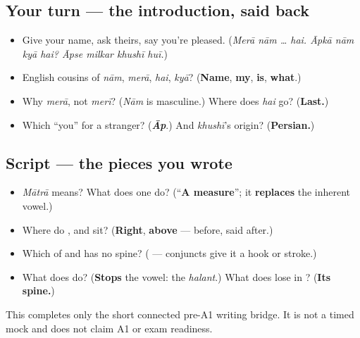 \subsection*{Your turn — the introduction, said back}
\begin{itemize}
\raggedright
  \item Give your name, ask theirs, say you're pleased. (\emph{Merā nām … hai. Āpkā nām kyā hai? Āpse milkar khushī huī.})
  \item English cousins of \emph{nām}, \emph{merā}, \emph{hai}, \emph{kyā}? (\textbf{Name}, \textbf{my}, \textbf{is}, \textbf{what}.)
  \item Why \emph{merā}, not \emph{merī}? (\emph{Nām} is masculine.) Where does \emph{hai} go? (\textbf{Last.})
  \item Which \textquotedblleft{}you\textquotedblright{} for a stranger? (\emph{\textbf{Āp}}.) And \emph{khushī}'s origin? (\textbf{Persian.})
\end{itemize}

\subsection*{Script — the pieces you wrote}
\begin{itemize}
\raggedright
  \item \emph{Mātrā} means? What does one do? (\textquotedblleft{}\textbf{A measure}\textquotedblright{}; it \textbf{replaces} the inherent vowel.)
  \item Where do \textbf{}, \textbf{} and \textbf{} sit? (\textbf{Right}, \textbf{above} — \textbf{} before, said after.)
  \item Which of  and  has no spine? (\textbf{} — conjuncts give it a hook or stroke.)
  \item What does \textbf{} do? (\textbf{Stops} the vowel: the \emph{halant}.) What does  lose in \textbf{}? (\textbf{Its spine.})
\end{itemize}

\begin{tcolorbox}[breakable,colback=teal!4,colframe=teal!35!black,title={Before you move on}]
This completes only the short connected pre-A1 writing bridge. It is not a timed mock and does not claim A1 or exam readiness.
\end{tcolorbox}
